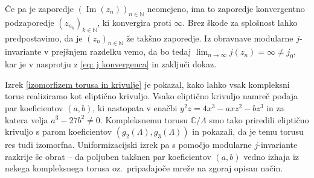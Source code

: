 \documentclass[mat1]{fmfdelo}
\numberwithin{equation}{section}
\newcommand{\N}{\mathbb N}
\newcommand{\Z}{\mathbb Z}
\newcommand{\C}{\mathbb C}
\newcommand{\HH}{\mathfrak{H}}
\newcommand{\torus}{\C/\Lambda}
\newcommand{\abs}[1]{\left\lvert #1 \right\rvert}
\renewcommand\Re{\operatorname{Re}}%
\renewcommand\Im{\operatorname{Im}}%
\newcommand{\oz}{oz.\ }
\theoremstyle{definition}
\begin{document}
\begin{dokaz}
    Če pa je zaporedje $(\Im(z_n))_{n \in \N}$ neomejeno, ima to zaporedje konvergentno podzaporedje $(z_{n_k})_{k \in \N}$, ki konvergira proti $\infty$. 
    Brez škode za splošnost lahko predpostavimo, da je $(z_n)_{n \in \N}$ že takšno zaporedje. Iz obravnave modularne $j$-invariante v prejšnjem razdelku vemo, da bo tedaj $\lim_{n \to \infty}j(z_n) = \infty \neq j_0$, kar je v nasprotju z \eqref{eq: j konvergenca} in zaključi dokaz.
\end{dokaz}

Izrek \ref{izomorfizem torusa in krivulje} je pokazal, kako lahko vsak kompleksni torus realiziramo kot eliptično krivuljo. Vsako eliptično krivuljo namreč podaja par koeficientov $(a,b)$, ki nastopata v enačbi $y^2z = 4x^3 - axz^2 - bz^3$ in za katera velja $a^3 - 27b^2 \neq 0$. Kompleksnemu torusu $\torus$ smo tako priredili eliptično krivuljo s parom koeficientov $(g_2(\Lambda), g_3(\Lambda))$ in pokazali, da je temu torusu res tudi izomorfna. Uniformizacijski izrek pa s pomočjo modularne $j$-invariante razkrije še obrat -- da poljuben takšnen par koeficientov $(a,b)$ vedno izhaja iz nekega kompleksnega torusa \oz pripadajoče mreže na zgoraj opisan način.
\end{document}
